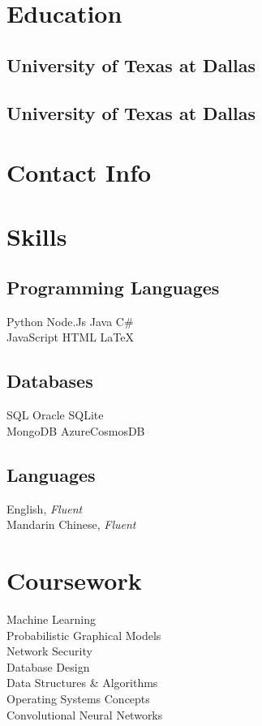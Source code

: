 \documentclass{fortythree_resume}
\begin{document}
\sectionsep

\begin{minipage}[t]{0.33\textwidth}

\section{Education}
\subsection{University of Texas at Dallas}
\subsection{University of Texas at Dallas}
\sectionsep

\section{Contact Info}
\sectionsep

\section{Skills}
\subsection{Programming Languages}
Python \textbullet{} Node.Js \textbullet{} Java \textbullet{} C\# \\
JavaScript \textbullet{} HTML \textbullet{} \LaTeX
\subsection{Databases}
SQL \textbullet{} Oracle \textbullet{} SQLite\\ 
MongoDB \textbullet{} AzureCosmosDB
\subsection{Languages}
English, \emph{Fluent}\\
Mandarin Chinese, \emph{Fluent}\\
\sectionsep

\section{Coursework}
Machine Learning\\
Probabilistic Graphical Models\\
Network Security\\
Database Design\\
Data Structures \& Algorithms\\
Operating Systems Concepts\\
Convolutional Neural Networks

\end{minipage}
\end{document}
